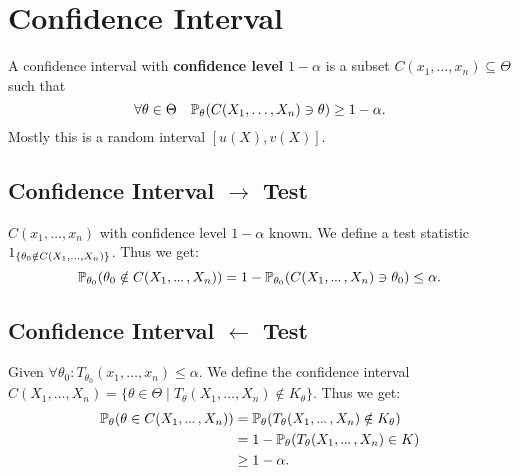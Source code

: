 \section{Confidence Interval}
\begin{definition*}
  A confidence interval with \textbf{confidence level} \(1 - \alpha\) is a subset \(C(x_1, \ldots, x_n) \subseteq \Theta\) such that
  \[\forall \theta \in \Theta \quad \P_\theta(C(X_1, \ldots, X_n) \ni \theta) \geq 1 - \alpha.\]
  Mostly this is a random interval \([u(X), v(X)]\).
\end{definition*}

\subsection*{Confidence Interval \(\to\) Test}
\(C(x_1, \ldots, x_n)\) with confidence level \(1 - \alpha\) known. We define a test statistic \(\I_{\{\theta_0 \notin C(X_1, \ldots, X_n)\}}\). Thus we get:
\[\P_{\theta_0}(\theta_0 \notin C(X_1, \sdots, X_n)) = 1 - \P_{\theta_0}(C(X_1, \sdots, X_n)\ni \theta_0) \leq \alpha.\]

\subsection*{Confidence Interval \(\leftarrow\) Test}
Given \(\forall \theta_0: T_{\theta_0}(x_1, \ldots, x_n) \leq \alpha\). We define the confidence interval \(C(X_1, \ldots, X_n) = \{\theta \in \Theta \mid T_\theta(X_1, \ldots, X_n) \notin K_\theta\}\). Thus we get:
\begin{align*}
  \P_\theta(\theta \in C(X_1, \sdots, X_n)) &= \P_\theta(T_\theta(X_1, \sdots, X_n) \notin K_\theta) \\
  &= 1 - \P_\theta(T_\theta(X_1, \sdots, X_n) \in K) \\
  &\geq 1 - \alpha.
\end{align*}
